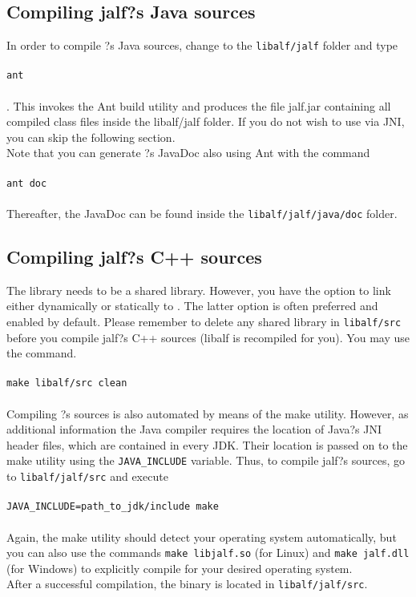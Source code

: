 \subsection{Compiling jalf?s Java sources}
In order to compile \jalf?s Java sources, change to the \texttt{libalf/jalf} folder and type \\ \\ \texttt{ant} \\ \\. This invokes the Ant build utility and produces the file jalf.jar containing all compiled class files inside the libalf/jalf folder. If you do not wish to use \jalf via JNI, you can skip the following section. \\
Note that you can generate \jalf?s JavaDoc also using Ant with the command \\ \\ \texttt{ant doc} \\ \\Thereafter, the JavaDoc can be found inside the \texttt{libalf/jalf/java/doc} folder.

\subsection{Compiling jalf?s C++ sources}
The \jalf \cpp library needs to be a shared library. However, you have the option to link \libalf either dynamically or statically to \jalf. The latter option is often preferred and enabled by default. Please remember to delete any shared library in \texttt{libalf/src} before you compile jalf?s C++ sources (libalf is recompiled for you). You may use the command. 
\\ \\ 
\texttt{make libalf/src clean} 
\paragraph{}
Compiling \jalf?s \cpp sources is also automated by means of the make utility. However, as additional information the Java compiler requires the location of Java?s JNI header files, which are contained in every JDK. Their location is passed on to the make utility using the \texttt{JAVA\_INCLUDE} variable. Thus, to compile jalf?s \cpp sources, go to \texttt{libalf/jalf/src} and execute
\\ \\
\texttt{JAVA\_INCLUDE=path\_to\_jdk/include make}
\\ \\
Again, the make utility should detect your operating system automatically, but you can also use the commands \texttt{make libjalf.so} (for Linux) and \texttt{make jalf.dll} (for Windows) to explicitly compile \jalf for your desired operating system. 
\\
After a successful compilation, the binary is located in \texttt{libalf/jalf/src}.

